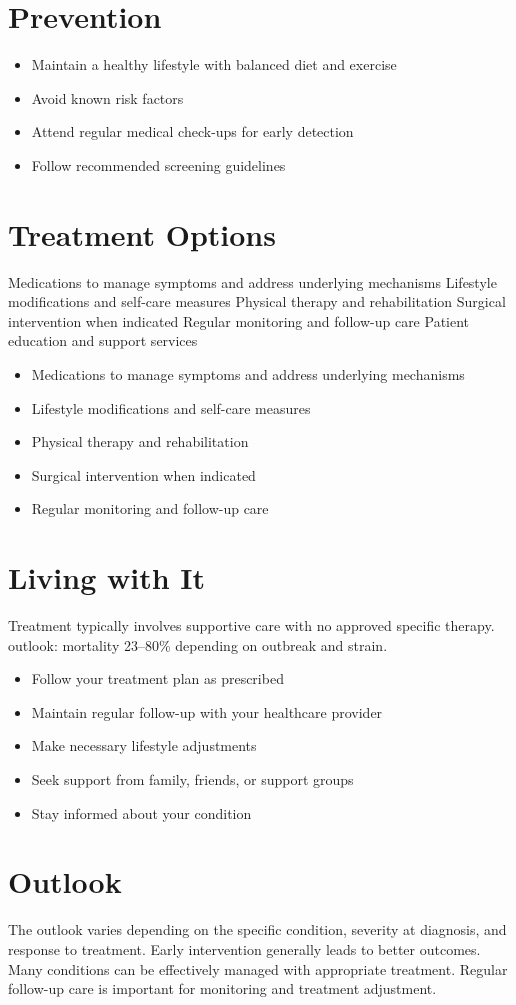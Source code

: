 \section{Prevention}
\begin{itemize}[noitemsep]
  \item Maintain a healthy lifestyle with balanced diet and exercise
  \item Avoid known risk factors
  \item Attend regular medical check-ups for early detection
  \item Follow recommended screening guidelines
\end{itemize}
\section{Treatment Options}
Medications to manage symptoms and address underlying mechanisms Lifestyle modifications and self-care measures Physical therapy and rehabilitation Surgical intervention when indicated Regular monitoring and follow-up care Patient education and support services

\begin{itemize}[noitemsep]
  \item Medications to manage symptoms and address underlying mechanisms
  \item Lifestyle modifications and self-care measures
  \item Physical therapy and rehabilitation
  \item Surgical intervention when indicated
  \item Regular monitoring and follow-up care
\end{itemize}
\section{Living with It}
Treatment typically involves supportive care with no approved specific therapy. outlook: mortality 23--80\% depending on outbreak and strain.

\begin{itemize}[noitemsep]
  \item Follow your treatment plan as prescribed
  \item Maintain regular follow-up with your healthcare provider
  \item Make necessary lifestyle adjustments
  \item Seek support from family, friends, or support groups
  \item Stay informed about your condition
\end{itemize}
\section{Outlook}
The outlook varies depending on the specific condition, severity at diagnosis, and response to treatment. Early intervention generally leads to better outcomes. Many conditions can be effectively managed with appropriate treatment. Regular follow-up care is important for monitoring and treatment adjustment.
